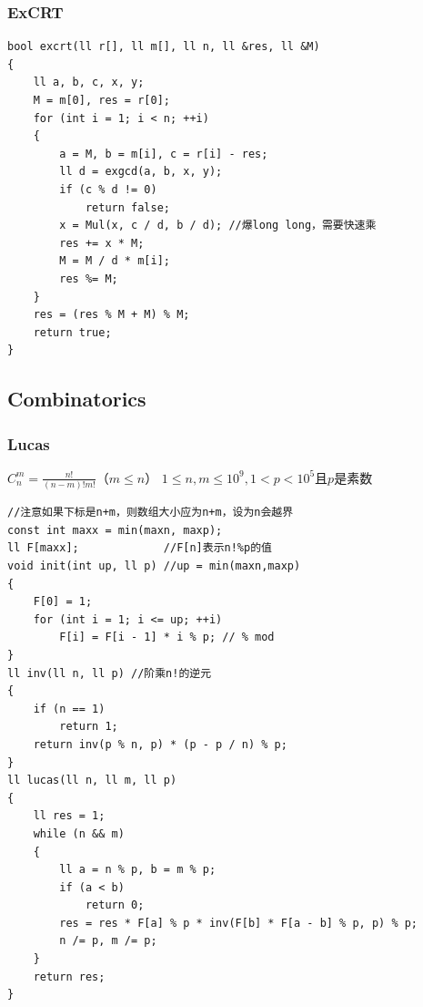 \documentclass[twoside]{article}
\begin{document}
\subsubsection{ExCRT}
\begin{lstlisting}
bool excrt(ll r[], ll m[], ll n, ll &res, ll &M)
{
    ll a, b, c, x, y;
    M = m[0], res = r[0];
    for (int i = 1; i < n; ++i)
    {
        a = M, b = m[i], c = r[i] - res;
        ll d = exgcd(a, b, x, y);
        if (c % d != 0)
            return false;
        x = Mul(x, c / d, b / d); //爆long long，需要快速乘
        res += x * M;
        M = M / d * m[i];
        res %= M;
    }
    res = (res % M + M) % M;
    return true;
}
\end{lstlisting}
\subsection{Combinatorics}
\subsubsection{Lucas}
$C_{n}^{m} = \frac{n!}{(n-m)!m!}（m \leq n）$
$1 \leq n,m \leq 10^9, 1<p<10^5且p是素数$
\begin{lstlisting}
//注意如果下标是n+m，则数组大小应为n+m，设为n会越界
const int maxx = min(maxn, maxp);
ll F[maxx];             //F[n]表示n!%p的值
void init(int up, ll p) //up = min(maxn,maxp)
{
    F[0] = 1;
    for (int i = 1; i <= up; ++i)
        F[i] = F[i - 1] * i % p; // % mod
}
ll inv(ll n, ll p) //阶乘n!的逆元
{
    if (n == 1)
        return 1;
    return inv(p % n, p) * (p - p / n) % p;
}
ll lucas(ll n, ll m, ll p)
{
    ll res = 1;
    while (n && m)
    {
        ll a = n % p, b = m % p;
        if (a < b)
            return 0;
        res = res * F[a] % p * inv(F[b] * F[a - b] % p, p) % p;
        n /= p, m /= p;
    }
    return res;
}
\end{lstlisting}
\end{document}
